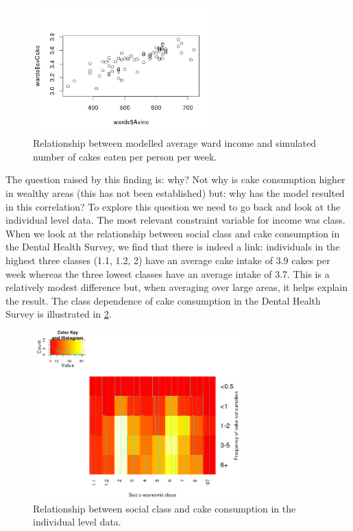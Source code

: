 \documentclass[a4paper, 11pt, twoside]{article}
\begin{document}
\begin{figure}
\centering
 \includegraphics[width=7cm]{incomeCake}
\caption{Relationship between modelled average ward income and
 simulated number of cakes eaten per person per week.}
\label{incomeCake}
\end{figure}

The question raised by this finding is: why? 
Not why is cake consumption higher in wealthy areas (this has not
been established) but: why has the model resulted in this correlation?
To explore this question we need to go back and look at the individual
level data. The most relevant constraint variable for income was class.
When we look at the relationship between social class and cake consumption
in the Dental Health Survey, we find that there is indeed a link:
individuals in the highest three classes (1.1, 1.2, 2) have an average
cake intake of 3.9 cakes per week whereas the three lowest classes have
an average intake of 3.7. This is a relatively modest difference but,
when averaging over large areas, it helps explain the result.
The class dependence of cake consumption in the Dental Health Survey is
illustrated in \cref{hm}.

\begin{figure}
\centering
 \includegraphics[width=8cm]{hm}
\caption{Relationship between social class and cake consumption in the
individual level data.}
\label{hm}
\end{figure}
\end{document}
